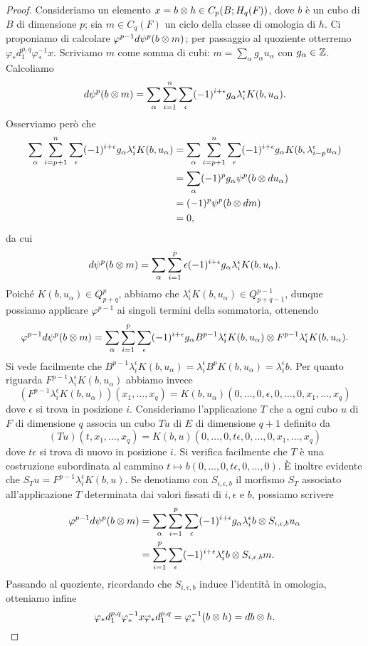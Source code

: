 \begin{proof}
Consideriamo un elemento $x=b\mathbin{\otimes} h\in C_p(B;H_q(F))$, dove $b$ è un cubo di $B$ di dimensione $p$; sia $m\in C_q(F)$ un ciclo della classe di omologia di $h$. Ci proponiamo di calcolare $\varphi^{p-1}d\psi^p(b\mathbin{\otimes} m)$; per passaggio al quoziente otterremo $\varphi_*d^{p,q}_1\varphi_*^{-1}x$. Scriviamo $m$ come somma di cubi: $m=\sum_{\alpha}g_\alpha u_\alpha$ con $g_\alpha\in\mathbb{Z}$. Calcoliamo
$$
d\psi^p(b\mathbin{\otimes} m)=\sum_\alpha\sum_{i=1}^n\sum_\epsilon(-1)^{i+\epsilon}g_\alpha\lambda^\epsilon_iK(b,u_\alpha).
$$
Osserviamo però che
\begin{align*}
\sum_\alpha\sum_{i=p+1}^n\sum_\epsilon(-1)^{i+\epsilon}g_\alpha\lambda^\epsilon_iK(b,u_\alpha)&=\sum_{\alpha}\sum_{i=p+1}^n\sum_\epsilon(-1)^{i+\epsilon}g_\alpha K(b,\lambda^\epsilon_{i-p}u_\alpha)\\
&=\sum_\alpha(-1)^pg_\alpha\psi^p(b\mathbin{\otimes} du_\alpha)\\
&=(-1)^p\psi^p(b\mathbin{\otimes} dm)\\
&=0,
\end{align*}
da cui
$$
d\psi^p(b\mathbin{\otimes} m)=\sum_\alpha\sum_{i=1}^p\epsilon(-1)^{i+\epsilon}g_\alpha\lambda^\epsilon_iK(b,u_\alpha).
$$
Poiché $K(b,u_\alpha)\in Q^p_{p+q}$, abbiamo che $\lambda^\epsilon_iK(b,u_\alpha)\in Q^{p-1}_{p+q-1}$, dunque possiamo applicare $\varphi^{p-1}$ ai singoli termini della sommatoria, ottenendo
$$
\varphi^{p-1}d\psi^p(b\mathbin{\otimes} m)=\sum_\alpha\sum_{i=1}^p\sum_\epsilon(-1)^{i+\epsilon}g_\alpha B^{p-1}\lambda^\epsilon_iK(b,u_\alpha)\mathbin{\otimes} F^{p-1}\lambda^\epsilon_iK(b,u_\alpha).
$$
Si vede facilmente che $B^{p-1}\lambda^{\epsilon}_iK(b,u_\alpha)=\lambda^\epsilon_i B^pK(b,u_\alpha)=\lambda^\epsilon_ib$. Per quanto riguarda $F^{p-1}\lambda^\epsilon_iK(b,u_\alpha)$ abbiamo invece
$$
(F^{p-1}\lambda^\epsilon_iK(b,u_\alpha))(x_1,\ldots,x_q)=K(b,u_\alpha)(0,\ldots,0,\epsilon,0,\ldots,0,x_1,\ldots,x_q)
$$
dove $\epsilon$ si trova in posizione $i$. Consideriamo l'applicazione $T$ che a ogni cubo $u$ di $F$ di dimensione $q$ associa un cubo $Tu$ di $E$ di dimensione $q+1$ definito da
$$
(Tu)(t,x_1,\ldots,x_q)=K(b,u)(0,\ldots,0,t\epsilon,0,\ldots,0,x_1,\ldots,x_q)
$$
dove $t\epsilon$ si trova di nuovo in posizione $i$. Si verifica facilmente che $T$ è una costruzione subordinata al cammino $t\mapsto b(0,\ldots,0,t\epsilon,0,\ldots,0)$. È inoltre evidente che $S_Tu=F^{p-1}\lambda^\epsilon_iK(b,u)$. Se denotiamo con $S_{i,\epsilon,b}$ il morfismo $S_T$ associato all'applicazione $T$ determinata dai valori fissati di $i,\epsilon$ e $b$, possiamo scrivere
\begin{align*}
\varphi^{p-1}d\psi^p(b\mathbin{\otimes} m)&=\sum_\alpha\sum_{i=1}^p\sum_\epsilon(-1)^{i+\epsilon}g_\alpha\lambda^\epsilon_ib\mathbin{\otimes} S_{i,\epsilon,b}u_\alpha\\
&=\sum_{i=1}^p\sum_\epsilon(-1)^{i+\epsilon}\lambda^\epsilon_ib\mathbin{\otimes} S_{i,\epsilon,b}m.
\end{align*}
Passando al quoziente, ricordando che $S_{i,\epsilon, b}$ induce l'identità in omologia, otteniamo infine
$$
\varphi_*d^{p,q}_1\varphi_*^{-1}x\varphi_*d^{p,q}_1=\varphi_*^{-1}(b\mathbin{\otimes} h)=db\mathbin{\otimes} h.
$$
\end{proof}
